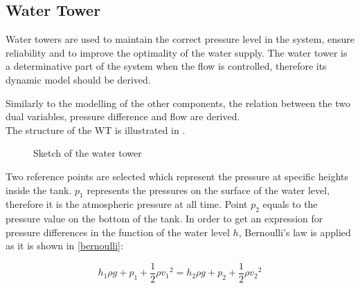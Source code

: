 \subsection{Water Tower} 
\label{WaterTankModel}

Water towers are used to maintain the correct pressure level in the system, ensure reliability and to improve the optimality of the water supply. The water tower is a determinative part of the system when the flow is controlled, therefore its dynamic model should be derived. 

Similarly to the modelling of the other components, the relation between the two dual variables, pressure difference and flow are  derived.
\\
The structure of the WT is illustrated in .


\begin{figure}[H]
\centering
 
\caption{Sketch of the water tower}
\label{fig:watertower_sketch}
\end{figure}

Two reference points are selected which represent the pressure at specific heights inside the tank. $p_1$ represents the pressures on the surface of the water level, therefore it is the atmospheric pressure at all time. Point $p_2$ equals to the pressure value on the bottom of the tank. In order to get an expression for pressure differences in the function of the water level $h$, Bernoulli's law is applied as it is shown in \eqref{bernoulli}: 

\begin{equation}
  \label{bernoulli}
  h_1\rho g + p_1 + \frac{1}{2}\rho {v_1}^2 = h_2\rho g + p_2 + \frac{1}{2}\rho {v_2}^2
\end{equation}

